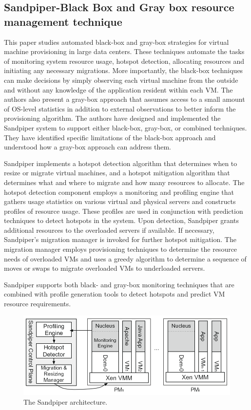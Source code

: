 \documentclass[conference]{IEEEtran}
\begin{document}
\subsection{Sandpiper-Black Box and Gray box resource management technique}
This paper studies automated black-box and gray-box strategies for virtual machine provisioning in large data centers. These techniques automate the tasks of monitoring system resource usage, hotspot detection, allocating resources and initiating any necessary migrations. More importantly, the black-box techniques can make decisions by simply observing each virtual
machine from the outside and without any knowledge of the application resident within each VM. The authors also present a gray-box approach that assumes access to a small
amount of OS-level statistics in addition to external observations
to better inform the provisioning algorithm. The authors have designed and implemented the Sandpiper system to support either black-box, gray-box, or combined
techniques. They have identified specific limitations of the
black-box approach and understood how a gray-box approach
can address them.


Sandpiper implements a hotspot detection algorithm
that determines when to resize or migrate virtual machines,
and a hotspot mitigation algorithm that determines what
and where to migrate and how many resources to allocate.
The hotspot detection component employs a monitoring
and profiling engine that gathers usage statistics on various
virtual and physical servers and constructs profiles of
resource usage. These profiles are used in conjunction with
prediction techniques to detect hotspots in the system.
Upon detection, Sandpiper grants additional resources to
the overloaded servers if available. If necessary, Sandpiper’s migration manager is invoked for further hotspot
mitigation. The migration manager employs provisioning
techniques to determine the resource needs of overloaded
VMs and uses a greedy algorithm to determine a sequence
of moves or swaps to migrate overloaded VMs to underloaded
servers.



Sandpiper supports both black- and gray-box monitoring
techniques that are combined with profile generation
tools to detect hotspots and predict VM resource
requirements.

\begin{figure}[h!]
  \centering
   \includegraphics[scale=0.30]{sandpiper_arch.png}
  \caption{The Sandpiper architecture.}
\end{figure}
\end{document}
